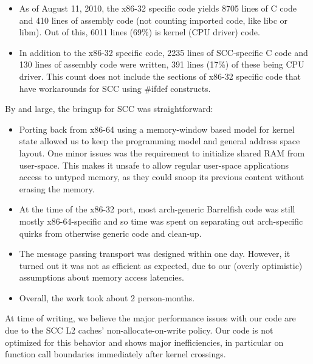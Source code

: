 \documentclass[a4paper,twoside]{report} %
\begin{document}
\begin{itemize}

\item As of August 11, 2010, the x86-32 specific code yields 8705
  lines of C code and 410 lines of assembly code (not counting
  imported code, like libc or libm). Out of this, 6011 lines (69\%) is
  kernel (CPU driver) code.

\item In addition to the x86-32 specific code, 2235 lines of
  SCC-specific C code and 130 lines of assembly code were written, 391 
  lines (17\%) of these being CPU driver. This count does not include
  the sections of x86-32 specific code that have workarounds for SCC
  using \#ifdef constructs.
\end{itemize}

By and large, the bringup for SCC was straightforward:


\begin{itemize}
\item Porting back from x86-64 using a memory-window
  based model for kernel state allowed us to keep the programming
  model and general address space layout.  One minor issues was the
  requirement to initialize shared RAM from
  user-space.  This makes it unsafe to allow regular user-space
  applications access to untyped memory, as they could snoop its
  previous content without erasing the memory.

\item At the time of the x86-32 port, most arch-generic Barrelfish
  code was still mostly x86-64-specific and so time was spent on
  separating out arch-specific quirks from otherwise generic code and
  clean-up. 

\item The message passing transport was designed within one
  day. However, it turned out it was not as efficient as expected, due
  to our (overly optimistic) assumptions about memory access latencies.

\item Overall, the work took about 2 person-months.
\end{itemize}

At time of writing, we believe the major performance issues with our
code are due to the SCC L2 caches' non-allocate-on-write policy. Our
code is not optimized for this behavior and shows major
inefficiencies, in particular on function call boundaries immediately after
kernel crossings.
\end{document}
